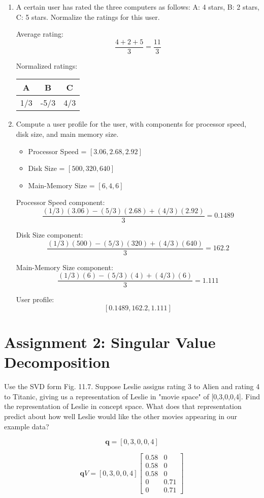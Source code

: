 \documentclass{article}
\begin{document}
\begin{enumerate}
\item{A certain user has rated the three computers as follows: A: 4 stars, B: 2 stars, C: 5 stars. Normalize the ratings for this user.

Average rating: $$\frac{4+2+5}{3} = \frac{11}{3}$$

Normalized ratings:
	\begin{center}
	\begin{tabular}{ c | c | c }
		A    & B     & C    \\ \hline
		1/3 & -5/3 & 4/3
	\end{tabular}
\end{center}
}
\item{Compute a user profile for the user, with components for processor speed, disk size, and main memory size.
	
	\begin{itemize}
		\item Processor Speed = $[3.06, 2.68, 2.92]$
		\item Disk Size = $[500, 320, 640]$
		\item Main-Memory Size = $[6, 4, 6]$
	\end{itemize}

	Processor Speed component:
	$$\frac{(1/3)(3.06)-(5/3)(2.68)+(4/3)(2.92)}{3} = 0.1489$$

	Disk Size component:
	$$\frac{(1/3)(500)-(5/3)(320)+(4/3)(640)}{3} = 162.2$$
	
	Main-Memory Size component:
	$$\frac{(1/3)(6)-(5/3)(4)+(4/3)(6)}{3} = 1.111$$

	User profile:
	$$[0.1489, 162.2, 1.111]$$

}
\end{enumerate}

\section{Assignment 2: Singular Value Decomposition}
Use the SVD form Fig. 11.7. Suppose Leslie assigns rating 3 to Alien and rating 4 to Titanic, giving us a representation of Leslie in "movie space" of [0,3,0,0,4]. Find the representation of Leslie in concept space. What does that representation predict about how well Leslie would like the other movies appearing in our example data?

\[
\mathbf{q} = [0,3,0,0,4]
\]

\[
\mathbf{q}V = [0,3,0,0,4]
\begin{bmatrix}
	0.58 & 0 \\
	0.58 & 0 \\
	0.58 & 0 \\
	0 & 0.71 \\
	0 & 0.71
\end{bmatrix}
\]
\end{document}
